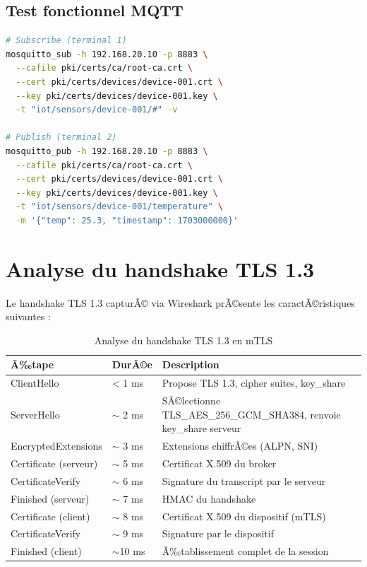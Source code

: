 \subsection{Test fonctionnel MQTT}

\begin{lstlisting}[language=bash, caption=Test publish/subscribe MQTT via mosquitto\_pub/sub]
# Subscribe (terminal 1)
mosquitto_sub -h 192.168.20.10 -p 8883 \
  --cafile pki/certs/ca/root-ca.crt \
  --cert pki/certs/devices/device-001.crt \
  --key pki/certs/devices/device-001.key \
  -t "iot/sensors/device-001/#" -v

# Publish (terminal 2)
mosquitto_pub -h 192.168.20.10 -p 8883 \
  --cafile pki/certs/ca/root-ca.crt \
  --cert pki/certs/devices/device-001.crt \
  --key pki/certs/devices/device-001.key \
  -t "iot/sensors/device-001/temperature" \
  -m '{"temp": 25.3, "timestamp": 1703000000}'
\end{lstlisting}

\section{Analyse du handshake TLS 1.3}

Le handshake TLS 1.3 capturÃ© via Wireshark prÃ©sente les caractÃ©ristiques suivantes :

\begin{table}[H]
\centering
\caption{Analyse du handshake TLS 1.3 en mTLS}
\label{tab:handshake_tls}
\begin{tabular}{llp{6cm}}
\toprule
\textbf{Ã‰tape} & \textbf{DurÃ©e} & \textbf{Description} \\
\midrule
ClientHello & < 1 ms & Propose TLS 1.3, cipher suites, key\_share \\
ServerHello & $\sim$ 2 ms & SÃ©lectionne TLS\_AES\_256\_GCM\_SHA384, renvoie key\_share serveur \\
EncryptedExtensions & $\sim$ 3 ms & Extensions chiffrÃ©es (ALPN, SNI) \\
Certificate (serveur) & $\sim$ 5 ms & Certificat X.509 du broker \\
CertificateVerify & $\sim$ 6 ms & Signature du transcript par le serveur \\
Finished (serveur) & $\sim$ 7 ms & HMAC du handshake \\
Certificate (client) & $\sim$ 8 ms & Certificat X.509 du dispositif (mTLS) \\
CertificateVerify & $\sim$ 9 ms & Signature par le dispositif \\
Finished (client) & $\sim$10 ms & Ã‰tablissement complet de la session \\
\bottomrule
\end{tabular}
\end{table}

